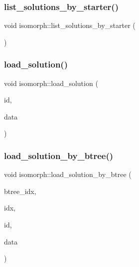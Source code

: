 \subsubsection{\texorpdfstring{list\+\_\+solutions\+\_\+by\+\_\+starter()}{list\_solutions\_by\_starter()}}
{\footnotesize\ttfamily void isomorph\+::list\+\_\+solutions\+\_\+by\+\_\+starter (\begin{DoxyParamCaption}{ }\end{DoxyParamCaption})}

\mbox{\label{classisomorph_a18df8e5d8ba2c2fe7c6d59a2d42768a5}} 
\subsubsection{\texorpdfstring{load\+\_\+solution()}{load\_solution()}}
{\footnotesize\ttfamily void isomorph\+::load\+\_\+solution (\begin{DoxyParamCaption}\item[{\mbox{\hyperlink{galois_8h_a09fddde158a3a20bd2dcadb609de11dc}{I\+NT}}}]{id,  }\item[{\mbox{\hyperlink{galois_8h_a09fddde158a3a20bd2dcadb609de11dc}{I\+NT}} $\ast$}]{data }\end{DoxyParamCaption})}

\mbox{\label{classisomorph_a7e1d9b879292c9f8c6a83c03073826f3}} 
\subsubsection{\texorpdfstring{load\+\_\+solution\+\_\+by\+\_\+btree()}{load\_solution\_by\_btree()}}
{\footnotesize\ttfamily void isomorph\+::load\+\_\+solution\+\_\+by\+\_\+btree (\begin{DoxyParamCaption}\item[{\mbox{\hyperlink{galois_8h_a09fddde158a3a20bd2dcadb609de11dc}{I\+NT}}}]{btree\+\_\+idx,  }\item[{\mbox{\hyperlink{galois_8h_a09fddde158a3a20bd2dcadb609de11dc}{I\+NT}}}]{idx,  }\item[{\mbox{\hyperlink{galois_8h_a09fddde158a3a20bd2dcadb609de11dc}{I\+NT}} \&}]{id,  }\item[{\mbox{\hyperlink{galois_8h_a09fddde158a3a20bd2dcadb609de11dc}{I\+NT}} $\ast$}]{data }\end{DoxyParamCaption})}

